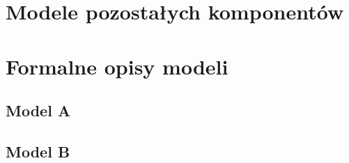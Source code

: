 \documentclass{pracamgr}
\theoremstyle{plain}
\begin{document}
\appendix
\chapter{Modele pozostałych komponentów}
\label{app:other-models}
\chapter{Formalne opisy modeli}
\label{app:descriptions}
\section{Model A}
\section{Model B}

{}

\end{document}
